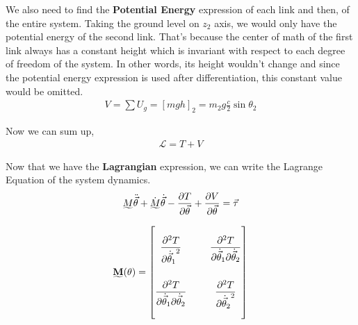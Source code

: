 \documentclass[conference]{IEEEtran}
\begin{document}
We also need to find the \textbf{Potential Energy} expression of each link and then, of the entire system. Taking the ground level on $z_2$ axis, we would only have the potential energy of the second link. That's because the center of math of the first link always has a constant height which is invariant with respect to each degree of freedom of the system. In other words, its height wouldn't change and since the potential energy expression is used after differentiation, this constant value would be omitted.
\begin{align}
    V = \sum U_g = [m g h]_2 = m_2 g \frac{c}{2} \sin \theta_2
\end{align}

Now we can sum up,
\begin{align}
    \mathcal{L} = T + V
\end{align}

Now that we have the \textbf{Lagrangian} expression, we can write the Lagrange Equation of the system dynamics.
\begin{align}
    \undertilde{M} \ddot{\vec{\theta}} + \dot{\undertilde{M}} \dot{\vec{\theta}} - \frac{\partial T}{\partial \vec{\theta}} +\frac{\partial V}{\partial \vec{\theta}} = \vec{\tau} \label{eq:overal}
\end{align}

\begin{normalsize}
    \begin{align}
        \renewcommand{\arraystretch}{3}%
        \setlength{\arraycolsep}{12pt}%
        \mathbf{
            \undertilde{M}(\theta) = \begin{bmatrix}
                                         \dfrac{\partial^2 T}{\partial {\dot{\vec{\theta}}_1}^2}                           & \dfrac{\partial^2 T}{\partial \dot{\vec{\theta}}_1 \partial \dot{\vec{\theta}}_2} \\[10px]
                                         \dfrac{\partial^2 T}{\partial \dot{\vec{\theta}}_1 \partial \dot{\vec{\theta}}_2} & \dfrac{\partial^2 T}{\partial {\dot{\vec{\theta}}_2}^2}                           \\[15px]
                                     \end{bmatrix}
        }
    \end{align}
\end{normalsize}
\end{document}
